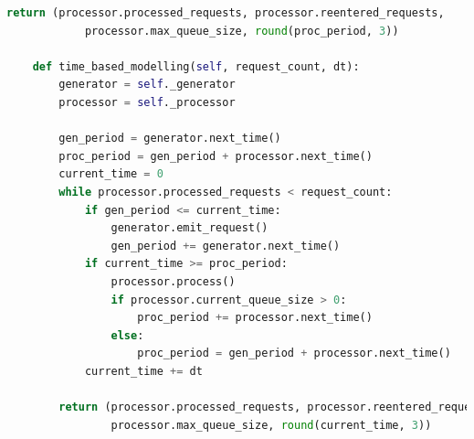 \documentclass[a4paper, 12pt]{article}
\begin{document}
\begin{lstlisting}[language=Python, caption = Программная реализация обслуживающего аппарата]
	return (processor.processed_requests, processor.reentered_requests,
			processor.max_queue_size, round(proc_period, 3))

	def time_based_modelling(self, request_count, dt):
		generator = self._generator
		processor = self._processor

		gen_period = generator.next_time()
		proc_period = gen_period + processor.next_time()
		current_time = 0
		while processor.processed_requests < request_count:
			if gen_period <= current_time:
				generator.emit_request()
				gen_period += generator.next_time()
			if current_time >= proc_period:
				processor.process()
				if processor.current_queue_size > 0:
					proc_period += processor.next_time()
				else:
					proc_period = gen_period + processor.next_time()
			current_time += dt
	
		return (processor.processed_requests, processor.reentered_requests,
				processor.max_queue_size, round(current_time, 3))
\end{lstlisting}
\end{document}
